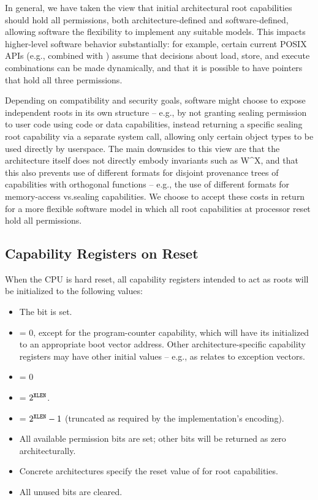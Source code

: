 In general, we have taken the view that initial architectural root
capabilities should hold all permissions, both architecture-defined and
software-defined, allowing software the flexibility to implement any suitable
models.
This impacts higher-level software behavior substantially: for example,
certain current POSIX APIs (e.g.,  combined with
) assume that decisions about load, store, and execute
combinations can be made dynamically, and that it is possible to have pointers
that hold all three permissions.

Depending on compatibility and security goals, software might choose to expose
independent roots in its own structure -- e.g., by not granting sealing
permission to user code using code or data capabilities, instead returning
a specific sealing root capability via a separate system call, allowing only
certain object types to be used directly by userspace.
The main downsides to this view are that the architecture itself does not
directly embody invariants such as W\^{}X, and that this also prevents use of
different formats for disjoint provenance trees of capabilities with orthogonal
functions -- e.g., the use of different formats for memory-access vs.\@ sealing
capabilities.
We choose to accept these costs in return for a more flexible software model
in which all root capabilities at processor reset hold all permissions.

\subsection{Capability Registers on Reset}

When the CPU is hard reset, all capability registers intended to act as roots
will be initialized to the following values:

\begin{itemize}
\item
The \ctag{} bit is set.
\item
\coffset{} = 0, except for the program-counter capability, which will have its
\coffset{} initialized to an appropriate boot vector address.
Other architecture-specific capability registers may have other initial values
-- e.g., as relates to exception vectors.
\item
\cbase{} = 0
\item
\clength{} = $2^{{\texttt{XLEN}}{}}$.
\item
\cotype{} = $2^{{\texttt{XLEN}}{}}-1$ (truncated as required by the implementation's encoding).
\item
All available permission bits are set; other bits will be returned as zero
architecturally.
\item
Concrete architectures specify the reset value of \cflags{} for root capabilities.
\item
All unused bits are cleared.
\end{itemize}

